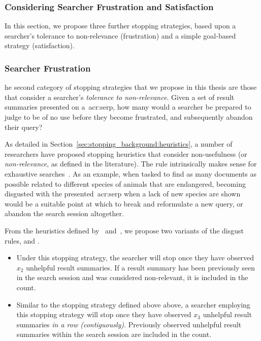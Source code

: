 \subsubsection{Considering Searcher Frustration and Satisfaction}
In this section, we propose three further stopping strategies, based upon a searcher's tolerance to non-relevance (frustration) and a simple goal-based strategy (satisfaction).

\subsubsection{Searcher Frustration}
he second category of stopping strategies that we propose in this thesis are those that consider a searcher's \emph{tolerance to non-relevance}. Given a set of result summaries presented on a~\gls{acr:serp}, how many would a searcher be prepared to judge to be of no use before they become frustrated, and subsequently abandon their query?

As detailed in Section~\ref{sec:stopping_background:heuristics}, a number of researchers have proposed stopping heuristics that consider non-usefulness (or \emph{non-relevance}, as defined in the literature). The rule intrinsically makes sense for exhaustive searches~\cite{kraft1979stopping_rules}. As an example, when tasked to find as many documents as possible related to different species of animals that are endangered, becoming disgusted with the presented~\gls{acr:serp} when a lack of new species are shown would be a suitable point at which to break and reformulate a new query, or abandon the search session altogether.

From the heuristics defined by~\citealt{cooper1973retrieval_effectiveness_ii} and~\citealt{kraft1979stopping_rules}, we propose two variants of the disgust rules,  and .

\begin{itemize}
    
    \item[]{} Under this stopping strategy, the searcher will stop once they have observed $x_2$ unhelpful result summaries. If a result summary has been previously seen in the search session and was considered non-relevant, it is included in the count.
    
    \item[]{} Similar to the stopping strategy defined above above, a searcher employing this stopping strategy will stop once they have observed $x_3$ unhelpful result summaries \emph{in a row (contiguously)}. Previously observed unhelpful result summaries within the search session are included in the count.
    
\end{itemize}

